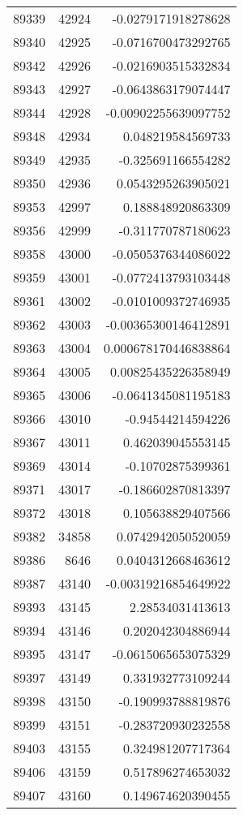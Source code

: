 \begin{tabular}{r | r | r}
89339 & 42924 & -0.0279171918278628 \\
89340 & 42925 & -0.0716700473292765 \\
89342 & 42926 & -0.0216903515332834 \\
89343 & 42927 & -0.0643863179074447 \\
89344 & 42928 & -0.00902255639097752 \\
89348 & 42934 & 0.048219584569733 \\
89349 & 42935 & -0.325691166554282 \\
89350 & 42936 & 0.0543295263905021 \\
89353 & 42997 & 0.188848920863309 \\
89356 & 42999 & -0.311770787180623 \\
89358 & 43000 & -0.0505376344086022 \\
89359 & 43001 & -0.0772413793103448 \\
89361 & 43002 & -0.0101009372746935 \\
89362 & 43003 & -0.00365300146412891 \\
89363 & 43004 & 0.000678170446838864 \\
89364 & 43005 & 0.00825435226358949 \\
89365 & 43006 & -0.0641345081195183 \\
89366 & 43010 & -0.94544214594226 \\
89367 & 43011 & 0.462039045553145 \\
89369 & 43014 & -0.10702875399361 \\
89371 & 43017 & -0.186602870813397 \\
89372 & 43018 & 0.105638829407566 \\
89382 & 34858 & 0.0742942050520059 \\
89386 & 8646 & 0.0404312668463612 \\
89387 & 43140 & -0.00319216854649922 \\
89393 & 43145 & 2.28534031413613 \\
89394 & 43146 & 0.202042304886944 \\
89395 & 43147 & -0.0615065653075329 \\
89397 & 43149 & 0.331932773109244 \\
89398 & 43150 & -0.190993788819876 \\
89399 & 43151 & -0.283720930232558 \\
89403 & 43155 & 0.324981207717364 \\
89406 & 43159 & 0.517896274653032 \\
89407 & 43160 & 0.149674620390455 \\

\end{tabular}
